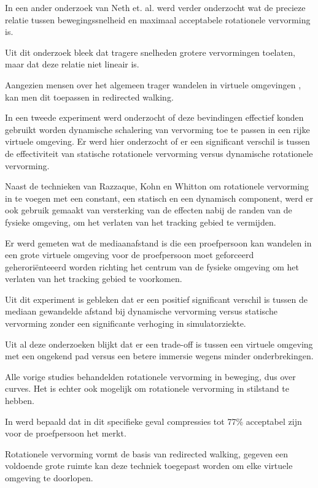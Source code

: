 \documentclass[a4paper,12pt]{article}
\begin{document}
In een ander onderzoek van Neth et. al. \cite{neth12} werd verder onderzocht wat
de precieze relatie tussen bewegingssnelheid en maximaal acceptabele rotationele
vervorming is.

Uit dit onderzoek bleek dat tragere snelheden grotere vervormingen toelaten, maar
dat deze relatie niet lineair is.

Aangezien mensen over het algemeen trager wandelen in virtuele omgevingen
\cite{mohler07}, kan men dit toepassen in redirected walking.

In een tweede experiment \cite{neth12} werd onderzocht of deze bevindingen
effectief konden gebruikt worden dynamische schalering van vervorming toe te
passen in een rijke virtuele omgeving. Er werd hier onderzocht of er een
significant verschil is tussen de effectiviteit van statische rotationele
vervorming versus dynamische rotationele vervorming.

Naast de technieken van Razzaque, Kohn en Whitton \cite{kohn01} om rotationele
vervorming in te voegen met een constant, een statisch en een dynamisch 
component, werd er ook gebruik gemaakt van versterking van de effecten nabij de 
randen van de fysieke omgeving, om het verlaten van het tracking gebied te 
vermijden.

Er werd gemeten wat de mediaanafstand is die een proefpersoon kan wandelen in 
een grote virtuele omgeving voor de proefpersoon moet geforceerd 
geherori\"enteeerd worden richting het centrum van de fysieke omgeving om het 
verlaten van het tracking gebied te voorkomen.

Uit dit experiment is gebleken dat er een positief significant verschil is tussen
de mediaan gewandelde afstand bij dynamische vervorming versus statische
vervorming zonder een significante verhoging in simulatorziekte.

Uit al deze onderzoeken blijkt dat er een trade-off is tussen een virtuele 
omgeving met een ongekend pad\cite{neth12} versus een betere immersie wegens 
minder onderbrekingen\cite{engel08,kohn01}. 

Alle vorige studies behandelden rotationele vervorming in beweging, dus over 
curves. Het is echter ook mogelijk om rotationele vervorming in stilstand te
hebben.

In \cite{steinicke09} werd bepaald dat in dit specifieke geval compressies tot
77\% acceptabel zijn voor de proefpersoon het merkt.

Rotationele vervorming vormt de basis van redirected walking, gegeven een
voldoende grote ruimte kan deze techniek toegepast worden om elke virtuele
omgeving te doorlopen.
\end{document}

